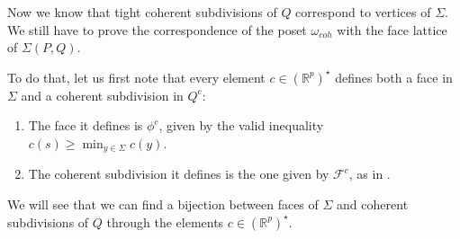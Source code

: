 \documentclass[10pt,a4paper]{article}
\newcommand{\RR}{\mathbb{R}}
\theoremstyle{plain}
\theoremstyle{remark}
\theoremstyle{definition}
\begin{document}

Now we know that tight coherent subdivisions of $Q$ correspond to vertices of $\Sigma$.
We still have to prove the correspondence of the poset $\omega_{coh}$ with 
the face lattice of $\Sigma(P,Q)$.

To do that, let us first note that every element $c\in(\RR^p)^\star$ defines
both a face in $\Sigma$ and a coherent subdivision in $Q^c$:
\begin{enumerate}
	\item The face it defines is 
	$\phi^c$, given by the valid inequality 
	$c(s) \geq \min_{y\in \Sigma} c(y)$. 
	\item The coherent subdivision it defines is the one given by
	$\mathcal{F}^c$, as in \cite[Def. 9.2]{ziegler2012lectures}.
\end{enumerate}

We will see that we can find a bijection between faces of $\Sigma$ and coherent subdivisions of $Q$
through the elements $c\in(\RR^p)^\star$.
\end{document}
